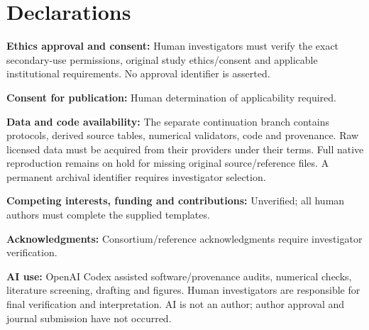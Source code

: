 \documentclass[11pt]{article}
\begin{document}
\section*{Declarations}
\textbf{Ethics approval and consent:} Human investigators must verify the exact secondary-use permissions, original study ethics/consent and applicable institutional requirements. No approval identifier is asserted.\par
\textbf{Consent for publication:} Human determination of applicability required.\par
\textbf{Data and code availability:} The separate continuation branch contains protocols, derived source tables, numerical validators, code and provenance. Raw licensed data must be acquired from their providers under their terms. Full native reproduction remains on hold for missing original source/reference files. A permanent archival identifier requires investigator selection.\par
\textbf{Competing interests, funding and contributions:} Unverified; all human authors must complete the supplied templates.\par
\textbf{Acknowledgments:} Consortium/reference acknowledgments require investigator verification.\par
\textbf{AI use:} OpenAI Codex assisted software/provenance audits, numerical checks, literature screening, drafting and figures. Human investigators are responsible for final verification and interpretation. AI is not an author; author approval and journal submission have not occurred.
\end{document}
